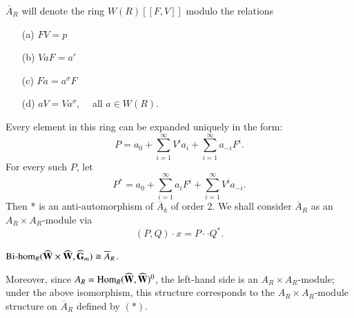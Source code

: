 \begin{defi*}
$\overline{A}_{R}$ will denote the ring $W(R)[[F,V]]$ modulo the relations
\begin{itemize}
\item[\rm(a)] $FV=p$

\item[\rm(b)] $VaF=a'$

\item[\rm(c)] $Fa=a^{\sigma}F$

\item[\rm(d)] $aV=Va^{\sigma}$, \ \ all $a\in W(R)$.
\end{itemize}
\end{defi*}
Every element in this ring can be expanded uniquely in the form:
$$
P=a_{0}+\sum\limits^{\infty}_{i=1}V^{i}a_{i}+\sum\limits^{\infty}_{i=1}a_{-i}F^{i}.
$$
For every such $P$, let
$$
P^{*}=a_{0}+\sum\limits^{\infty}_{i=1}a_{i}F^{i}+\sum\limits^{\infty}_{i=1}V^{i}a_{-i}.
$$\pageoriginale
Then * is an anti-automorphism of $\overline{A}_{k}$ of order 2. We shall consider $\overline{A}_{R}$ as an $A_{R}\times A_{R}$-module via
\begin{equation*}
(P,Q)\cdot x=P\cdot \cdot Q^{*}.\tag{*}
\end{equation*}

\begin{proposition}\label{art15-prop3}
$\text{\rm Bi-hom}_{R} (\widehat{\mathbf{W}}\times \widehat{\mathbf{W}},\widehat{\mathbf{G}}_{m})\cong \overline{A}_{R}$.

\noindent
Moreover, since $A_{R}=\operatorname{\mathrm{Hom}}_{R}(\widehat{\mathbf{W}},\widehat{\mathbf{W}})^{0}$, the left-hand side is an $A_{R}\times A_{R}$-module; under the above isomorphism, this structure corresponds to the $A_{R}\times A_{R}$-module structure on $\overline{A}_{R}$ defined by $(*)$.
\end{proposition}

